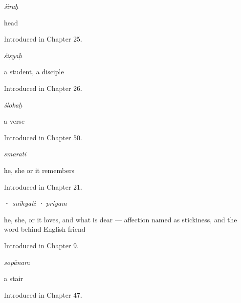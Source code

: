 \noindent\begin{minipage}[t]{\linewidth}
\raggedright
\textbf{}\enspace\emph{śiraḥ}\par
\small head\par
\footnotesize Introduced in Chapter 25.
\end{minipage}\par\medskip

\noindent\begin{minipage}[t]{\linewidth}
\raggedright
\textbf{}\enspace\emph{śiṣyaḥ}\par
\small a student, a disciple\par
\footnotesize Introduced in Chapter 26.
\end{minipage}\par\medskip

\noindent\begin{minipage}[t]{\linewidth}
\raggedright
\textbf{}\enspace\emph{ślokaḥ}\par
\small a verse\par
\footnotesize Introduced in Chapter 50.
\end{minipage}\par\medskip

\noindent\begin{minipage}[t]{\linewidth}
\raggedright
\textbf{}\enspace\emph{smarati}\par
\small he, she or it remembers\par
\footnotesize Introduced in Chapter 21.
\end{minipage}\par\medskip

\noindent\begin{minipage}[t]{\linewidth}
\raggedright
\textbf{ · }\enspace\emph{snihyati · priyam}\par
\small he, she, or it loves, and what is dear — affection named as stickiness, and the word behind English friend\par
\footnotesize Introduced in Chapter 9.
\end{minipage}\par\medskip

\noindent\begin{minipage}[t]{\linewidth}
\raggedright
\textbf{}\enspace\emph{sopānam}\par
\small a stair\par
\footnotesize Introduced in Chapter 47.
\end{minipage}\par\medskip

